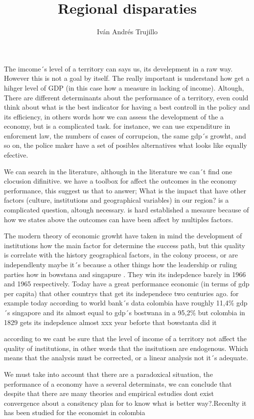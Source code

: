 \documentclass[12pt,letterpaper]{report}
\author{Iván Andrés Trujillo}
\begin{document}
\title{Regional disparaties}

The imcome´s level of a territory can says us, its develepment in a raw way. However this is not a goal by itself. The really important is understand how get a hihger level of GDP (in this case how a measure in lacking of income). Altough, There are different determinants about the performance of a territory, even could think about what is the best indicator for having a best controll in the policy and its efficiency, in others words how we can assess the development of the a economy, but is a complicated task. for instance, we can use expenditure in enforcment law, the numbers of cases of corrupcion, the same gdp´s growht, and so on, the police maker have a set of posibles alternatives what looks like equally efective.



We can search in the literature, although in the literature we can´t find one clocusion difinitive. we have a  toolbox for affect the outcomes in the economy performance, this suggest us that to answer; What is the impact that have other factors (culture, institutions and geographical variables) in our region? is a complicated question, altough necessary. is hard established a mesaure because of how we states above the outcomes can have been affect by multiples factors. 


The modern theory of economic growht have taken in mind the development of institutions how the main factor for determine the success path, but this quality is correlate with the history geographical factors, in the colony process, or are independlenty maybe it´s because a other things how the leadership or ruling parties how in bowstana and singapure \cite{rodriguez}. They win its indepdence barely in 1966 and 1965 respectively. Today have a great performance  economic (in terms of gdp per capita) that other countrys that get its independece two  centuries ago. for example today according to world bank´s data colombia have roughly 11,4\% gdp´s singapore and its almost equal to gdp´s bostwana in a 95,2\% but colombia  in 1829 gets its indepdence almost xxx year beforte that bowstanta did it

according to \cite{institutions} we cant be sure that the level of income of a territory not affect the quality of institutions, in other words that the insitutiosn are endogenous. Which means that the analysis must be corrected, or a linear analysis not it´s adequate.


We must take into account that there are a paradoxical situation, the performance of a economy have a several determinats, we can  conclude that despite that there are many theories and empirical estudies dont exist convergence about a consitency     plan for to know what is better way?.Recenlty it has been studied for the economist in colombia 
\end{document}
